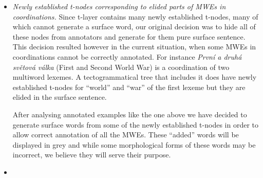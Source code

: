 \begin{itemize}
%
\item \emph{Newly established t-nodes corresponding to elided parts of MWEs in coordinations.} Since t-layer contains many newly established t-nodes, many of which cannot generate a surface word, our original decision was to hide all of these nodes from annotators and generate for them pure surface sentence. This decision resulted however in the current situation, when some MWEs in coordinations cannot be correctly annotated. 
For instance \emph{První a druhá světová válka} (First and Second World War) is a coordination of two multiword lexemes. A tectogrammatical tree that includes it does have newly established t-nodes for “world” and “war” of the first lexeme but they are elided in the surface sentence. 

After analysing annotated examples like the one above we have decided to generate surface words from some of the newly established t-nodes in order to allow correct annotation of all the MWEs. These ``added'' words will be displayed in grey and while some morphological forms of these words may be incorrect, we believe they will serve their purpose.


\item {} %
\end{itemize}



